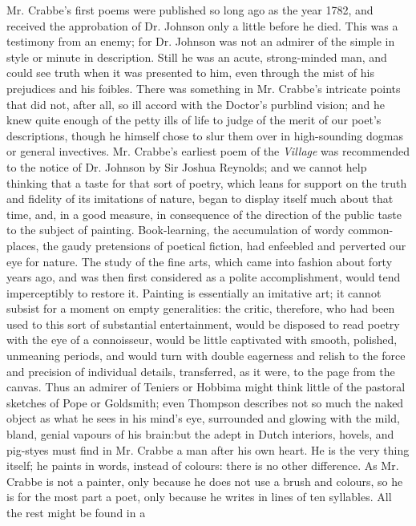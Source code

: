 Mr. Crabbe's first poems were published so long ago as the year 1782,
and received the approbation of Dr. Johnson only a little before he
died. This was a testimony from an enemy; for Dr. Johnson was not an
admirer of the simple in style or minute in description. Still he was an
acute, strong-minded man, and could see truth when it was presented to
him, even through the mist of his prejudices and his foibles. There was
something in Mr. Crabbe's intricate points that did not, after all, so
ill accord with the Doctor's purblind vision; and he knew quite
enough of the petty ills of life to judge of the merit of our poet's
descriptions, though he himself chose to slur them over in high-sounding
dogmas or general invectives. Mr. Crabbe's earliest poem of the
\emph{Village} was recommended to the notice of Dr. Johnson by Sir Joshua
Reynolds; and we cannot help thinking that a taste for that sort of
poetry, which leans for support on the truth and fidelity of its
imitations of nature, began to display itself much about that time, and,
in a good measure, in consequence of the direction of the public taste
to the subject of painting. Book-learning, the accumulation of wordy
common-places, the gaudy pretensions of poetical fiction, had enfeebled
and perverted our eye for nature. The study of the fine arts, which came
into fashion about forty years ago, and was then first considered as a
polite accomplishment, would tend imperceptibly to restore it. Painting
is essentially an imitative art; it cannot subsist for a moment on empty
generalities: the critic, therefore, who had been used to this sort of
substantial entertainment, would be disposed to read poetry with the
eye of a connoisseur, would be little captivated with smooth, polished,
unmeaning periods, and would turn with double eagerness and relish to
the force and precision of individual details, transferred, as it were,
to the page from the canvas. Thus an admirer of Teniers or Hobbima
might think little of the pastoral sketches of Pope or Goldsmith; even
Thompson describes not so much the naked object as what he sees in his
mind's eye, surrounded and glowing with the mild, bland, genial vapours
of his brain:\textemdash but the adept in Dutch interiors, hovels, and pig-styes
must find in Mr. Crabbe a man after his own heart. He is the very thing
itself; he paints in words, instead of colours: there is no other
difference. As Mr. Crabbe is not a painter, only because he does not use
a brush and colours, so he is for the most part a poet, only because
he writes in lines of ten syllables. All the rest might be found in a
